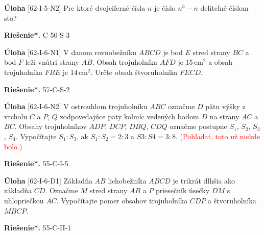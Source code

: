 \documentclass{article}
\newcommand{\rieh}{\textbf{Riešenie*.} }
\newcommand\todo[1]{\noindent\textcolor{red}{(#1)}}
\newcommand{\problem}[3]{
  \begin{tcolorbox}[breakable,notitle,boxrule=0pt,colback=light-gray,colframe=light-gray]
    \textbf{Úloha}
    [#1] #2
  \end{tcolorbox}
  \noindent#3
}
\begin{document}
\problem{62-I-5-N2}{
Pre ktoré dvojciferné čísla $n$ je číslo $n^3-n$ deliteľné číslom sto? 
}{
\rieh C-50-S-3
}


\problem{62-I-6-N1}{
V danom rovnobežníku $ABCD$ je bod $E$ stred strany $BC$ a bod $F$ leží vnútri strany $AB$. Obsah trojuholníka $AFD$ je 15\,cm$^2$ a obsah trojuholníka $FBE$ je 14\,cm$^2$. Určte obsah štvoruholníka $FECD$.
}{
\rieh 57-C-S-2
}


\problem{62-I-6-N2}{
V ostrouhlom trojuholníku $ABC$ označme $D$ pätu výšky z vrcholu $C$ a $P$, $Q$ zodpovedajúce päty kolmíc vedených bodom $D$ na strany $AC$ a $BC$. Obsahy trojuholníkov $ADP$, $DCP$, $DBQ$, $CDQ$ označme postupne $S_1$, $S_2$, $S_3$, $S_4$. Vypočítajte $S_1 : S_3$, ak $S_1 : S_2 = 2 : 3$ a $S3 : S4 = 3 : 8$. \todo{Pohľadať, toto už niekde bolo.}
}{
\rieh 55-C-I-5
}


\problem{62-I-6-D1}{
Základňa $AB$ lichobežníka $ABCD$ je trikrát dlhšia ako základňa $CD$. Označme $M$ stred strany $AB$ a $P$ priesečník úsečky $DM$ s uhlopriečkou $AC$. Vypočítajte pomer obsahov trojuholníka $CDP$ a štvoruholníka $MBCP$.
}{
\rieh 55-C-II-1
}
\end{document}
